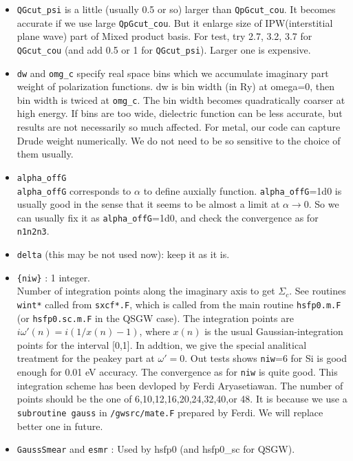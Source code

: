 \documentclass[a4paper,10pt,epsf,fleqn]{article}
\begin{document}
\begin{itemize}
\item
     \verb+QGcut_psi+ is a little (usually 0.5 or so) larger than \verb+QpGcut_cou+.
     It becomes accurate if we use large \verb+QpGcut_cou+. 
     But it enlarge size of IPW(interstitial plane wave) part of Mixed
     product basis. For test, try  2.7, 3.2, 3.7 for \verb+QGcut_cou+
     (and add 0.5 or 1 for \verb+QGcut_psi+). Larger one is expensive.
\item
     \verb+dw+ and \verb+omg_c+ specify real space bins which we accumulate imaginary part
     weight of polarization functions. dw is bin width (in Ry) at
     omega=0, then bin width is twiced at \verb+omg_c+.
     The bin width becomes quadratically coarser at high energy. 
     If bins are too wide, dielectric function can be less accurate, 
     but results are not necessarily so much affected. 
     For metal, our code can capture Drude weight
     numerically. We do not need to be so sensitive to the choice of
     them usually.
\item
     \verb+alpha_offG+\\
     {\tt alpha\_offG} corresponds to $\alpha$ to define auxially function.
      {\tt alpha\_offG}=1d0 is usually good in the sense that
      it seems to be almost a limit at $\alpha \to 0$.
      So we can usually fix it as {\tt alpha\_offG}=1d0, and check the
      convergence as for {\tt n1n2n3}.
\item
    \verb+delta+ (this may be not used now): keep it as it is.
\item
    \verb+{niw}+ : 1 integer. \\
Number of integration points along the imaginary axis to get $\Sigma_c$.
See routines {\tt wint*} called from {\tt sxcf*.F},
which is called from the main routine {\tt hsfp0.m.F} (or {\tt hsfp0.sc.m.F} in the QSGW case).
The integration points are $i \omega'(n)= i( 1/x(n) -1)$, where $x(n)$ is
the usual Gaussian-integration points for the interval [0,1].
In addtion, we give the special analitical treatment for the peakey part at $\omega'=0$.
Out tests shows {\tt niw}=6 for Si is good enough for 0.01 eV accuracy.
The convergence as for {\tt niw} is quite good.
This integration scheme has been devloped by Ferdi Aryasetiawan.
The number of points should be the one of 6,10,12,16,20,24,32,40,or 48. 
It is because we use a {\tt subroutine gauss} in {\tt /gwsrc/mate.F} 
prepared by Ferdi. We will replace better one in future. 
\item
\verb+GaussSmear+ and \verb+esmr+ : Used by hsfp0 (and hsfp0\_sc for QSGW). \\

\end{itemize}
\end{document}
